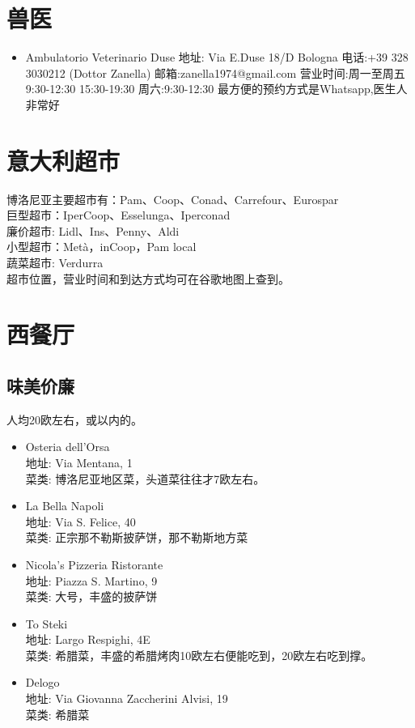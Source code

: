 \section{兽医}
\begin{itemize}
\item Ambulatorio Veterinario Duse
地址: Via E.Duse 18/D Bologna  电话:+39 328 3030212 (Dottor Zanella)
邮箱:zanella1974@gmail.com
营业时间:周一至周五9:30-12:30  15:30-19:30  周六:9:30-12:30
最方便的预约方式是Whatsapp,医生人非常好
\end{itemize}

\section{意大利超市}
\noindent 博洛尼亚主要超市有：Pam、Coop、Conad、Carrefour、Eurospar\\
巨型超市：IperCoop、Esselunga、Iperconad\\
廉价超市: Lidl、Ins、Penny、Aldi\\
小型超市：Metà，inCoop，Pam local\\
蔬菜超市: Verdurra\\
超市位置，营业时间和到达方式均可在谷歌地图上查到。

\section{西餐厅}

\subsection{味美价廉}
人均20欧左右，或以内的。

\begin{itemize}
\item Osteria dell'Orsa\\
地址: Via Mentana, 1\\
菜类: 博洛尼亚地区菜，头道菜往往才7欧左右。

\item La Bella Napoli\\
地址: Via S. Felice, 40\\
菜类: 正宗那不勒斯披萨饼，那不勒斯地方菜

\item Nicola's Pizzeria Ristorante\\
地址: Piazza S. Martino, 9\\
菜类: 大号，丰盛的披萨饼

\item To Steki\\
地址: Largo Respighi, 4E\\
菜类: 希腊菜，丰盛的希腊烤肉10欧左右便能吃到，20欧左右吃到撑。

\item Delogo\\
地址: Via Giovanna Zaccherini Alvisi, 19\\
菜类: 希腊菜

\end{itemize}

